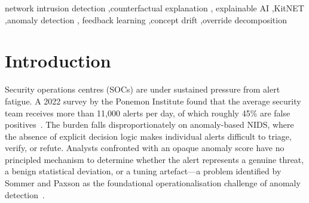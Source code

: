 \documentclass[preprint,12pt,authoryear]{elsarticle}
\begin{document}
\begin{frontmatter}
\begin{abstract}
transition scenarios tested.
We document a vulnerability to sustained adversarial feedback that establishes
no clean baseline, motivating mitigations discussed in \cref{sec:disc_poison}.
These findings motivate the pass decomposition architecture as a design
consideration for IDS operating on botnet-class traffic, particularly where
attack-type classification overrides are a structural component of the enforcement
pipeline.
Evaluated on a second dataset (UNSW-NB15, 82{,}332 flows, 9 attack categories),
the autoencoder anomaly detector achieves AUC~0.81 with 97.1\% precision at a
strict 99th-percentile threshold (System~A), rising to 84.3\% recall when the
decision layer is applied (System~B).
A LIME and SHAP comparison confirms the structural limitation: 100\% of LIME
score/risk perturbations fail to change the enforcement action for override-locked
packets, versus 52\% for non-override-locked packets.
\end{abstract}

\begin{keyword}
network intrusion detection \sep counterfactual explanation \sep
explainable AI \sep KitNET \sep anomaly detection \sep
feedback learning \sep concept drift \sep override decomposition
\end{keyword}

\end{frontmatter}

\section{Introduction}
\label{sec:intro}

Security operations centres (SOCs) are under sustained pressure from alert
fatigue. A 2022 survey by the Ponemon Institute found that the average security
team receives more than 11{,}000 alerts per day, of which roughly 45\% are
false positives~\citep{Ponemon2022}. The burden falls disproportionately on
anomaly-based NIDS, where the absence of explicit decision logic makes
individual alerts difficult to triage, verify, or refute. Analysts confronted
with an opaque anomaly score have no principled mechanism to determine whether
the alert represents a genuine threat, a benign statistical deviation, or a
tuning artefact---a problem identified by Sommer and Paxson as the
foundational operationalisation challenge of anomaly
detection~\citep{Sommer2010}.
\end{document}
